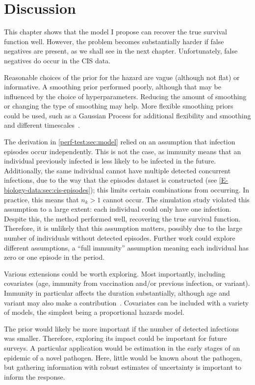 \documentclass[thesis.tex]{subfiles}
\begin{document}
\section{Discussion} \label{perf-test:sec:discussion}

This chapter shows that the model I propose can recover the true survival function well.
However, the problem becomes substantially harder if false negatives are present, as we shall see in the next chapter.
Unfortunately, false negatives do occur in the CIS data.

Reasonable choices of the prior for the hazard are vague (although not flat) or informative.
A smoothing prior performed poorly, although that may be influenced by the choice of hyperparameters.
Reducing the amount of smoothing or changing the type of smoothing may help.
More flexible smoothing priors could be used, such as a Gaussian Process for additional flexibility and smoothing and different timescales~\autocite{saulGaussian}.

The derivation in \cref{perf-test:sec:model} relied on an assumption that infection episodes occur independently.
This is not the case, as immunity means that an individual previously infected is less likely to be infected in the future.
Additionally, the same individual cannot have multiple detected concurrent infections, due to the way that the episodes dataset is constructed (see \cref{E-biology-data:sec:cis-episodes}); this limits certain combinations from occurring.
In practice, this means that $n_k > 1$ cannot occur.
The simulation study violated this assumption to a large extent: each individual could only have one infection.
Despite this, the method performed well, recovering the true survival function.
Therefore, it is unlikely that this assumption matters, possibly due to the large number of individuals without detected episodes.
Further work could explore different assumptions, \eg a ``full immunity'' assumption meaning each individual has zero or one episode in the period.

Various extensions could be worth exploring.
Most importantly, including covariates (\eg age, immunity from vaccination and/or previous infection, or variant).
Immunity in particular affects the duration substantially, although age and variant may also make a contribution~\autocite{hakkiOnset,russellWithinhost}.
Covariates can be included with a variety of models, the simplest being a proportional hazards model.

The prior would likely be more important if the number of detected infections was smaller.
Therefore, exploring its impact could be important for future surveys.
A particular application would be estimation in the early stages of an epidemic of a novel pathogen.
Here, little would be known about the pathogen, but gathering information with robust estimates of uncertainty is important to inform the response.
\end{document}
